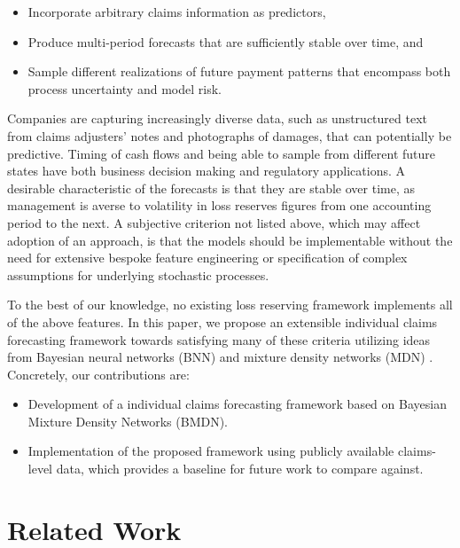 \documentclass{article}
\begin{document}
\begin{itemize}
	\item Incorporate arbitrary claims information as predictors,
	\item Produce multi-period forecasts that are sufficiently stable over time, and
	\item Sample different realizations of future payment patterns that encompass both process uncertainty and model risk.
\end{itemize}
Companies are capturing increasingly diverse data, such as unstructured text from claims adjusters' notes and photographs of damages, that can potentially be predictive. Timing of cash flows and being able to sample from different future states have both business decision making and regulatory applications. A desirable characteristic of the forecasts is that they are stable over time, as management is averse to volatility in loss reserves figures from one accounting period to the next. A subjective criterion not listed above, which may affect adoption of an approach, is that the models should be implementable without the need for extensive bespoke feature engineering or specification of complex assumptions for underlying stochastic processes.

To the best of our knowledge, no existing loss reserving framework implements all of the above features. In this paper, we propose an extensible individual claims forecasting framework towards satisfying many of these criteria utilizing ideas from Bayesian neural networks (BNN) \cite{Neal:1996:BLN:525544} and mixture density networks (MDN) \cite{bishop1994mixture}. Concretely, our contributions are:

\begin{itemize}
	\item Development of a individual claims forecasting framework based on Bayesian Mixture Density Networks (BMDN).
	\item Implementation of the proposed framework using publicly available claims-level data, which provides a baseline for future work to compare against.
\end{itemize}

\section{Related Work}
\end{document}
